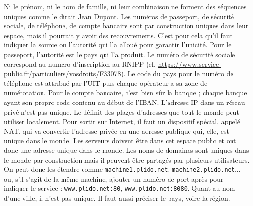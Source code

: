          \vspace{2em}

{Ni le prénom, ni le nom de famille, ni leur combinaison ne forment des séquences uniques comme le dirait Jean Dupont.
Les numéros de passeport, de sécurité sociale, de téléphone, de compte bancaire sont par construction uniques dans leur espace, mais il pourrait y avoir des recouvrements. C'est pour cela qu'il faut indiquer la source ou l'autorité qui l'a alloué pour garantir l'unicité. Pour le passeport, l’autorité est le pays qui l’a produit. Le numéro de sécurité sociale correspond au numéro d'inscription au  \ac{RNIPP} (cf. \url{https://www.service-public.fr/particuliers/vosdroits/F33078}). Le code du pays pour le numéro de téléphone est attribué par l'UIT puis chaque opérateur a sa zone de numérotation. Pour le compte bancaire, c’est bien sûr la banque ; chaque banque ayant son propre code contenu au début de l'\ac{IBAN}.
L'adresse IP dans un réseau privé n'est pas unique. Le  définit des plages d'adresses que tout le monde peut utiliser localement. Pour sortir sur Internet, il faut un dispositif spécial, appelé \ac{NAT}, qui va convertir l'adresse privée en une adresse publique qui, elle, est unique dans le monde. Les serveurs doivent être dans cet espace public et ont donc une adresse unique dans le monde.
Les noms de domaines sont uniques dans le monde par construction mais il peuvent être partagés par plusieurs utilisateurs. On peut donc les étendre comme \texttt{machine1.plido.net}, \texttt{machine2.plido.net}... ou, s'il s'agit de la même machine, ajouter un numéro de port après pour indiquer le service : \texttt{www.plido.net:80}, \texttt{www.plido.net:8080}.
Quant au nom d'une ville, il n'est pas unique. Il faut aussi préciser le pays, voire la région.
}
 

